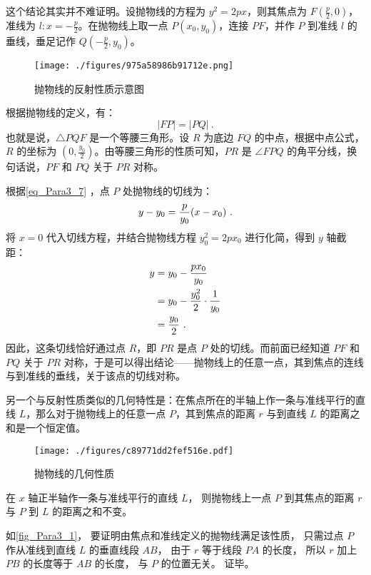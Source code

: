 这个结论其实并不难证明。设抛物线的方程为 $y^2 = 2px$，则其焦点为 $\displaystyle F\left(\frac{p}{2}, 0\right)$，准线为 $\displaystyle l: x = -\frac{p}{2}$。在抛物线上取一点 $P(x_0, y_0)$，连接 $PF$，并作 $P$ 到准线 $l$ 的垂线，垂足记作 $Q\left( \displaystyle -\frac{p}{2}, y_0 \right)$。

\begin{figure}[ht]
\centering
\texttt{[image: ./figures/975a58986b91712e.png]}
\caption{抛物线的反射性质示意图} \label{fig_Para3_3}
\end{figure}

根据抛物线的定义，有：
\begin{equation}
|FP| = |PQ|~.
\end{equation}
也就是说，$\triangle PQF$ 是一个等腰三角形。设 $R$ 为底边 $FQ$ 的中点，根据中点公式，$R$ 的坐标为 $\displaystyle \left( 0, \frac{y_0}{2} \right)$。由等腰三角形的性质可知，$PR$ 是 $\angle FPQ$ 的角平分线，换句话说，$PF$ 和 $PQ$ 关于 $PR$ 对称。

根据\autoref{eq_Para3_7} ，点 $P$ 处抛物线的切线为：
\begin{equation}
y-y_0={p\over y_0}(x-x_0)~.
\end{equation}
将 $x = 0$ 代入切线方程，并结合抛物线方程 $y_0^2 = 2px_0$ 进行化简，得到 $y$ 轴截距：
\begin{equation}
\begin{split}
y&=y_0-{px_0\over y_0}\\
&=y_0-{y_0^2\over 2}\cdot{1\over y_0}\\
&={y_0\over 2}~.
\end{split}
\end{equation}
因此，这条切线恰好通过点 $R$，即 $PR$ 是点 $P$ 处的切线。而前面已经知道 $PF$ 和 $PQ$ 关于 $PR$ 对称，于是可以得出结论——抛物线上的任意一点，其到焦点的连线与到准线的垂线，关于该点的切线对称。

另一个与反射性质类似的几何特性是：在焦点所在的半轴上作一条与准线平行的直线 $L$，那么对于抛物线上的任意一点 $P$，其到焦点的距离 $r$ 与到直线 $L$ 的距离之和是一个恒定值。
\begin{figure}[ht]
\centering
\texttt{[image: ./figures/c89771dd2fef516e.pdf]}
\caption{抛物线的几何性质} \label{fig_Para3_1}
\end{figure}

在 $x$ 轴正半轴作一条与准线平行的直线 $L$， 则抛物线上一点 $P$ 到其焦点的距离 $r$ 与 $P$ 到 $L$ 的距离之和不变。

如\autoref{fig_Para3_1}， 要证明由焦点和准线定义的抛物线满足该性质， 只需过点 $P$ 作从准线到直线 $L$ 的垂直线段 $AB$， 由于 $r$ 等于线段 $PA$ 的长度， 所以 $r$ 加上 $PB$ 的长度等于 $AB$ 的长度， 与 $P$ 的位置无关。 证毕。